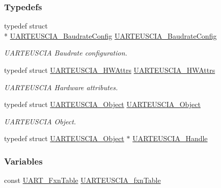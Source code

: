 \subsubsection*{Typedefs}
\begin{DoxyCompactItemize}
\item 
typedef struct \\*
\hyperlink{struct_u_a_r_t_e_u_s_c_i_a___baudrate_config}{U\-A\-R\-T\-E\-U\-S\-C\-I\-A\-\_\-\-Baudrate\-Config} \hyperlink{_u_a_r_t_e_u_s_c_i_a_8h_a2ab5c8b4f9b1bd5b375db37c1fc697e7}{U\-A\-R\-T\-E\-U\-S\-C\-I\-A\-\_\-\-Baudrate\-Config}
\begin{DoxyCompactList}\small\item\em U\-A\-R\-T\-E\-U\-S\-C\-I\-A Baudrate configuration. \end{DoxyCompactList}\item 
typedef struct \hyperlink{struct_u_a_r_t_e_u_s_c_i_a___h_w_attrs}{U\-A\-R\-T\-E\-U\-S\-C\-I\-A\-\_\-\-H\-W\-Attrs} \hyperlink{_u_a_r_t_e_u_s_c_i_a_8h_ac2776f64ec5846ca87b5ddcd052b551e}{U\-A\-R\-T\-E\-U\-S\-C\-I\-A\-\_\-\-H\-W\-Attrs}
\begin{DoxyCompactList}\small\item\em U\-A\-R\-T\-E\-U\-S\-C\-I\-A Hardware attributes. \end{DoxyCompactList}\item 
typedef struct \hyperlink{struct_u_a_r_t_e_u_s_c_i_a___object}{U\-A\-R\-T\-E\-U\-S\-C\-I\-A\-\_\-\-Object} \hyperlink{_u_a_r_t_e_u_s_c_i_a_8h_ace543e3e62c1500d7a6f1c2b96c139d1}{U\-A\-R\-T\-E\-U\-S\-C\-I\-A\-\_\-\-Object}
\begin{DoxyCompactList}\small\item\em U\-A\-R\-T\-E\-U\-S\-C\-I\-A Object. \end{DoxyCompactList}\item 
typedef struct \hyperlink{struct_u_a_r_t_e_u_s_c_i_a___object}{U\-A\-R\-T\-E\-U\-S\-C\-I\-A\-\_\-\-Object} $\ast$ \hyperlink{_u_a_r_t_e_u_s_c_i_a_8h_a175c740859abb56b7cb21810ce5a5ee3}{U\-A\-R\-T\-E\-U\-S\-C\-I\-A\-\_\-\-Handle}
\end{DoxyCompactItemize}
\subsubsection*{Variables}
\begin{DoxyCompactItemize}
\item 
const \hyperlink{struct_u_a_r_t___fxn_table}{U\-A\-R\-T\-\_\-\-Fxn\-Table} \hyperlink{_u_a_r_t_e_u_s_c_i_a_8h_a5dcb2ca228f03ca22a5f859e35b8f8da}{U\-A\-R\-T\-E\-U\-S\-C\-I\-A\-\_\-fxn\-Table}
\end{DoxyCompactItemize}


